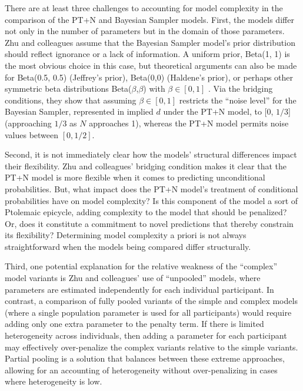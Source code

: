 \documentclass[
  english,
  man,floatsintext]{apa6}
\begin{document}
There are at least three challenges to accounting for model complexity in the comparison of the PT+N and Bayesian Sampler models. First, the models differ not only in the number of parameters but in the domain of those parameters. Zhu and colleagues \autocite*{zhu.etal2020} assume that the Bayesian Sampler model's prior distribution should reflect ignorance or a lack of information. A uniform prior, Beta(1, 1) is the most obvious choice in this case, but theoretical arguments can also be made for Beta(0.5, 0.5) (Jeffrey's prior), Beta(0,0) (Haldene's prior), or perhaps other symmetric beta distributions Beta(\(\beta\),\(\beta\)) with \(\beta \in [0, 1]\) \autocite{jaynes2003}. Via the bridging conditions, they show that assuming \(\beta \in [0, 1]\) restricts the ``noise level'' for the Bayesian Sampler, represented in implied \(d\) under the PT+N model, to {[}0, \(1/3\){]} (approaching \(1/3\) as \(N\) approaches 1), whereas the PT+N model permits noise values between \([0, 1/2]\).

Second, it is not immediately clear how the models' structural differences impact their flexibility. Zhu and colleagues' \autocite*{zhu.etal2020} bridging condition makes it clear that the PT+N model is more flexible when it comes to predicting unconditional probabilities. But, what impact does the PT+N model's treatment of conditional probabilities have on model complexity? Is this component of the model a sort of Ptolemaic epicycle, adding complexity to the model that should be penalized? Or, does it constitute a commitment to novel predictions that thereby constrain its flexibility? Determining model complexity a priori is not always straightforward when the models being compared differ structurally.

Third, one potential explanation for the relative weakness of the ``complex'' model variants is Zhu and colleagues' \autocite*{zhu.etal2020} use of ``unpooled'' models, where parameters are estimated independently for each individual participant. In contrast, a comparison of fully pooled variants of the simple and complex models (where a single population parameter is used for all participants) would require adding only one extra parameter to the penalty term. If there is limited heterogeneity across individuals, then adding a parameter for each participant may effectively over-penalize the complex variants relative to the simple variants. Partial pooling is a solution that balances between these extreme approaches, allowing for an accounting of heterogeneity without over-penalizing in cases where heterogeneity is low.
\end{document}
